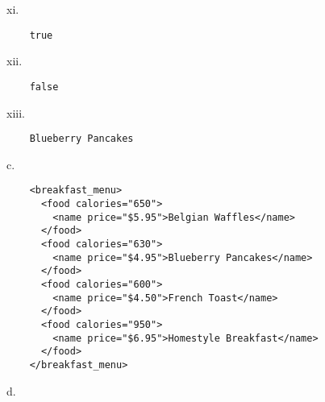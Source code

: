 \documentclass[10pt]{article}
\begin{document}
\begin{list}{} {}
\begin{list}{} {}
\item {xi. }
\begin{lstlisting}
	true
\end{lstlisting}

\item {xii. }
\begin{lstlisting}
	false
\end{lstlisting}

\item {xiii. }
\begin{lstlisting}
	Blueberry Pancakes
\end{lstlisting}
\end{list}

\item {c. }
\begin{lstlisting}
	<breakfast_menu>
	  <food calories="650">
	    <name price="$5.95">Belgian Waffles</name>
	  </food>
	  <food calories="630">
	    <name price="$4.95">Blueberry Pancakes</name>
	  </food>
	  <food calories="600">
	    <name price="$4.50">French Toast</name>
	  </food>
	  <food calories="950">
	    <name price="$6.95">Homestyle Breakfast</name>
	  </food>
	</breakfast_menu>
\end{lstlisting}

\item {d. }
\vspace{120mm}
\end{list}
\end{document}
